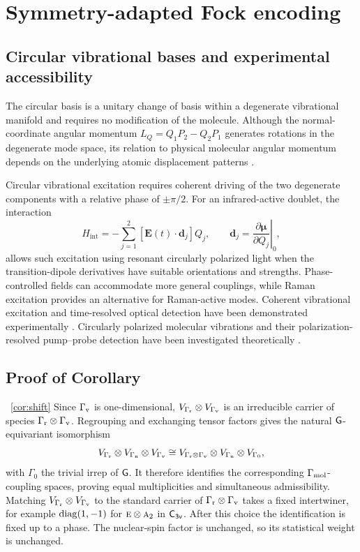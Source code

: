\section{Symmetry-adapted Fock encoding}

\subsection{Circular vibrational bases and experimental accessibility}
\label{app:circular_vibrations}

The circular basis is a unitary change of basis within a degenerate vibrational manifold and requires no modification of the molecule. Although the normal-coordinate angular momentum $L_Q=Q_1P_2-Q_2P_1$ generates rotations in the degenerate mode space, its relation to physical molecular angular momentum depends on the underlying atomic displacement patterns \cite{Herzberg1942,Amat1958}.

Circular vibrational excitation requires coherent driving of the two degenerate components with a relative phase of $\pm\pi/2$. For an infrared-active doublet, the interaction
\begin{equation}
H_{\mathrm{int}}
=-\sum_{j=1}^{2}
[\mathbf E(t)\cdot\mathbf d_j]Q_j,
\qquad
\mathbf d_j=
\left.\frac{\partial\boldsymbol{\mu}}{\partial Q_j}\right|_0,
\end{equation}
allows such excitation using resonant circularly polarized light when the transition-dipole derivatives have suitable orientations and strengths. Phase-controlled fields can accommodate more general couplings, while Raman excitation provides an alternative for Raman-active modes. Coherent vibrational excitation and time-resolved optical detection have been demonstrated experimentally \cite{Peschel2022,CoherentIR2024}. Circularly polarized molecular vibrations and their polarization-resolved pump--probe detection have been investigated theoretically \cite{Lin2025}.







\subsection{Proof of Corollary}~\ref{cor:shift}
\label{proof:shift}
Since \(\Gamma_{\mathrm{v}}\) is one-dimensional, \(V_{\Gamma_{\mathrm{r}}}\otimes V_{\Gamma_{\mathrm{v}}}\) is an irreducible carrier of species \(\Gamma_{\mathrm{r}}\otimes\Gamma_{\mathrm{v}}\). Regrouping and exchanging tensor factors gives the natural \(\mathsf{G}\)-equivariant isomorphism
\[
V_{\Gamma_{\mathrm{r}}}\otimes V_{\Gamma_{\mathrm{n}}}
\otimes V_{\Gamma_{\mathrm{v}}}
\cong
V_{\Gamma_{\mathrm{r}}\otimes\Gamma_{\mathrm{v}}}
\otimes V_{\Gamma_{\mathrm{n}}}\otimes V_{\Gamma_0},
\]
with \(\Gamma_0\) the trivial irrep of \(\mathsf{G}\).
It therefore identifies the corresponding \(\Gamma_{\mathrm{mol}}\)-coupling spaces, proving equal multiplicities and simultaneous admissibility. Matching $V_{\Gamma_{\mathrm{r}}}\otimes V_{\Gamma_{\mathrm{v}}}$ to the standard carrier of $\Gamma_{\mathrm{r}}\otimes\Gamma_{\mathrm{v}}$ takes a fixed intertwiner, for example $\operatorname{diag}(1,-1)$ for $\text{\normalfont\scshape e}\otimes\text{\normalfont\scshape a}_{2}$ in $\mathsf{C_{3v}}$. After this choice the identification is fixed up to a phase. The nuclear-spin factor is unchanged, so its statistical weight is unchanged.


